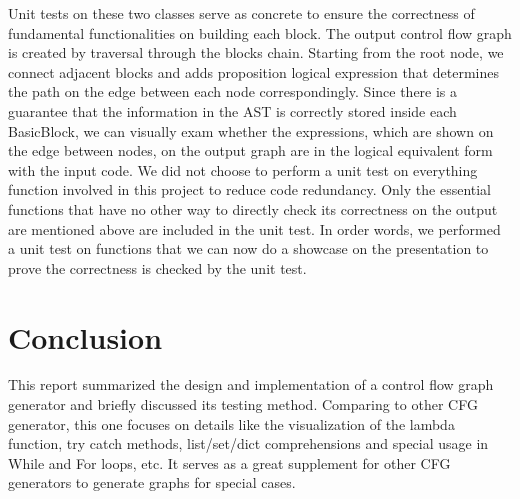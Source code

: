 \documentclass[11pt]{article}
\begin{document}
Unit tests on these two classes serve as concrete to ensure the correctness of fundamental functionalities on building each block. The output control flow graph is created by traversal through the blocks chain. Starting from the root node, we connect adjacent blocks and adds proposition logical expression that determines the path on the edge between each node correspondingly. Since there is a guarantee that the information in the AST is correctly stored inside each BasicBlock, we can visually exam whether the expressions, which are shown on the edge between nodes, on the output graph are in the logical equivalent form with the input code. We did not choose to perform a unit test on everything function involved in this project to reduce code redundancy. Only the essential functions that have no other way to directly check its correctness on the output are mentioned above are included in the unit test. In order words, we performed a unit test on functions that we can now do a showcase on the presentation to prove the correctness is checked by the unit test.

\section{Conclusion}\label{conclusion}
This report summarized the design and implementation of a control flow graph generator and briefly discussed its testing method. Comparing to other CFG generator, this one focuses on details like the visualization of the lambda function, try catch methods, list/set/dict comprehensions and special usage in While and For loops, etc. It serves as a great supplement for other CFG generators to generate graphs for special cases.
\end{document}
